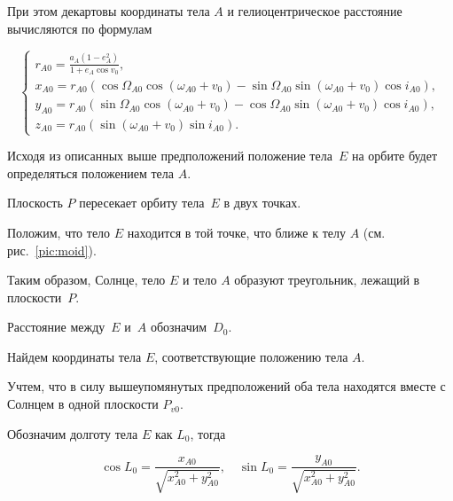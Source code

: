 При этом декартовы координаты тела $A$ и гелиоцентрическое расстояние вычисляются по формулам

\begin{equation}

\begin{cases}

\displaystyle	r_{A0} = \frac{a_A(1-e^2_A)}{1+e_A \cos v_0}, \\[2mm]

	x_{A0} = r_{A0}(\cos\Omega_{A0} \cos(\omega_{A0} + v_0) - \sin\Omega_{A0} \sin(\omega_{A0} + v_0) \cos i_{A0}), \\

	y_{A0} = r_{A0}(\sin\Omega_{A0} \cos(\omega_{A0} + v_0) - \cos\Omega_{A0} \sin(\omega_{A0} + v_0) \cos i_{A0}), \\

	z_{A0} = r_{A0}(\sin(\omega_{A0} + v_0) \sin i_{A0}).

\end{cases}\label{eq:KeplerOrbitToCartesian}

\end{equation}



Исходя из описанных выше предположений положение тела~$E$ на орбите будет определяться положением тела $A$. 

Плоскость $P$ пересекает орбиту тела~$E$ в двух точках. 

Положим, что тело $E$ находится в той точке, что ближе к телу $A$ (см. рис.~\ref{pic:moid}). 

Таким образом, Солнце, тело $E$ и тело $A$ образуют треугольник, лежащий в плоскости~$P$. 

Расстояние между~$E$ и~$A$ обозначим~$D_0$. 



Найдем координаты тела $E$, соответствующие положению тела $A$. 

Учтем, что в силу вышеупомянутых предположений оба тела находятся вместе с Солнцем в одной плоскости $P_{v0}$. 

Обозначим долготу тела $E$ как $L_0$, тогда

\begin{equation}

	\cos L_0 = \frac{x_{A0}}{\sqrt{x^2_{A0} + y^2_{A0}}},  \quad \sin L_0 = \frac{y_{A0}}{\sqrt{x^2_{A0} + y^2_{A0}}}.

\end{equation}



